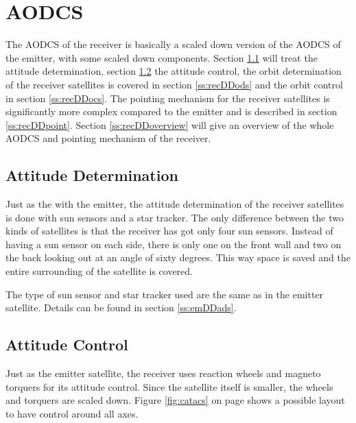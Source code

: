 \section{\acl{AODCS}}
\label{recDDadcs}
The \ac{AODCS} of the receiver is basically a scaled down version of the \ac{AODCS} of the emitter, with some scaled down components. Section \ref{ss:recDDads} will treat the attitude determination, section \ref{ss:recDDacs} the attitude control, the orbit determination of the receiver satellites is covered in section \ref{ss:recDDods} and the orbit control in section \ref{ss:recDDocs}. The pointing mechanism for the receiver satellites is significantly more complex compared to the emitter and is described in section \ref{ss:recDDpoint}. Section \ref{ss:recDDoverview} will give an overview of the whole \ac{AODCS} and pointing mechanism of the receiver.
\subsection{Attitude Determination}
\label{ss:recDDads}
Just as the with the emitter, the attitude determination of the receiver satellites is done with sun sensors and a star tracker. The only difference between the two kinds of satellites is that the receiver has got only four sun sensors. Instead of having a sun sensor on each side, there is only one on the front wall and two on the back looking out at an angle of sixty degrees. This way space is saved and the entire surrounding of the satellite is covered.

The type of sun sensor and star tracker used are the same as in the emitter satellite. Details can be found in section \ref{ss:emDDads}.

\subsection{Attitude Control}
\label{ss:recDDacs}
Just as the emitter satellite, the receiver uses reaction wheels and magneto torquers for its attitude control. Since the satellite itself is smaller, the wheels and torquers are scaled down. Figure \ref{fig:catacs} on page \pageref{fig:catacs} shows a possible layout to have control around all axes.

